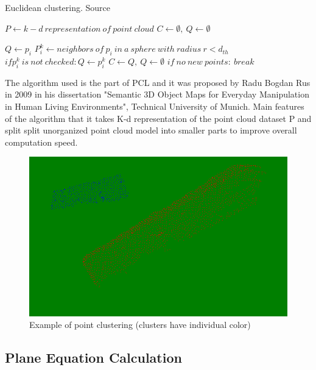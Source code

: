 \documentclass{ctuthesis}
\begin{document}
\begin{algorithm}
\caption{Euclidean clustering. Source \cite{euc}}\label{euc}
\begin{algorithmic}[1]
\State $P \gets k-d\ representation\ of\ point\ cloud$
\State $C \gets \emptyset,\ Q \gets \emptyset$

\State $Q \gets p_i$
\State $P_i^k \gets neighbors\ of\ p_i\ in\ a\ sphere\ with\ radius\ r < d_{th}$
\State $if p_i^k\ is\ not\ checked: Q \gets p_i^k$
\EndFor
\EndFor
\State $C \gets Q,\ Q \gets \emptyset$
\State $if\ no\ new\ points:\ break$
\EndFor

\end{algorithmic}
\end{algorithm}


The algorithm used is the part of PCL and it was proposed by Radu Bogdan Rus in 2009 in his dissertation "Semantic 3D Object Maps for Everyday Manipulation in Human Living Environments", Technical University of Munich. Main features of the algorithm that it takes K-d representation of the point cloud dataset P and split split unorganized point cloud model into smaller parts to improve overall computation speed.


\begin{figure}[htbp]
    \centering
    \includegraphics[width=\textwidth]{euc_cluster.png}
    \caption{Example of point clustering (clusters have individual color)}
    \label{fig:euc}
\end{figure}

\subsection{Plane Equation Calculation}
\end{document}
